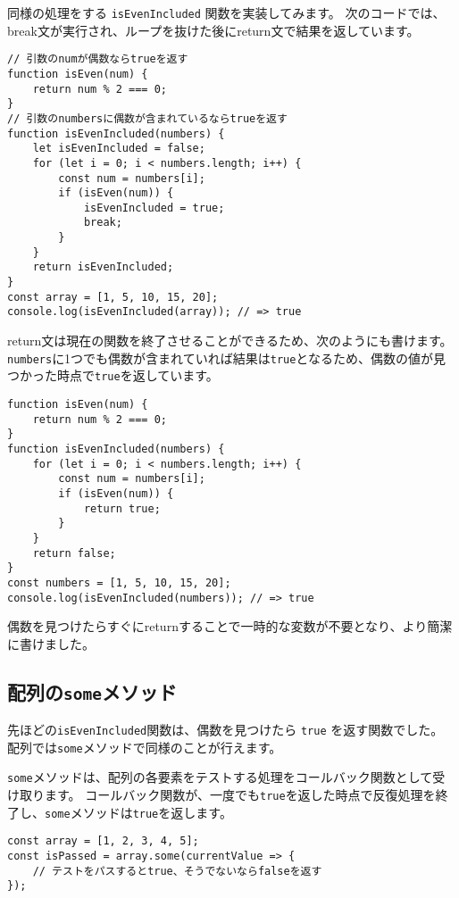 同様の処理をする \texttt{isEvenIncluded}
関数を実装してみます。
次のコードでは、break文が実行され、ループを抜けた後にreturn文で結果を返しています。

\begin{lstlisting}
// 引数のnumが偶数ならtrueを返す
function isEven(num) {
    return num % 2 === 0;
}
// 引数のnumbersに偶数が含まれているならtrueを返す
function isEvenIncluded(numbers) {
    let isEvenIncluded = false;
    for (let i = 0; i < numbers.length; i++) {
        const num = numbers[i];
        if (isEven(num)) {
            isEvenIncluded = true;
            break;
        }
    }
    return isEvenIncluded;
}
const array = [1, 5, 10, 15, 20];
console.log(isEvenIncluded(array)); // => true
\end{lstlisting}

return文は現在の関数を終了させることができるため、次のようにも書けます。
\texttt{numbers}に1つでも偶数が含まれていれば結果は\texttt{true}となるため、偶数の値が見つかった時点で\texttt{true}を返しています。

\begin{lstlisting}
function isEven(num) {
    return num % 2 === 0;
}
function isEvenIncluded(numbers) {
    for (let i = 0; i < numbers.length; i++) {
        const num = numbers[i];
        if (isEven(num)) {
            return true;
        }
    }
    return false;
}
const numbers = [1, 5, 10, 15, 20];
console.log(isEvenIncluded(numbers)); // => true
\end{lstlisting}

偶数を見つけたらすぐにreturnすることで一時的な変数が不要となり、より簡潔に書けました。

\hypertarget{array-some}{%
\subsection{\texorpdfstring{配列の\texttt{some}メソッド}{配列のsomeメソッド}}\label{array-some}}

先ほどの\texttt{isEvenIncluded}関数は、偶数を見つけたら
\texttt{true} を返す関数でした。
配列では\texttt{some}メソッドで同様のことが行えます。

\texttt{some}メソッドは、配列の各要素をテストする処理をコールバック関数として受け取ります。
コールバック関数が、一度でも\texttt{true}を返した時点で反復処理を終了し、\texttt{some}メソッドは\texttt{true}を返します。

\begin{lstlisting}
const array = [1, 2, 3, 4, 5];
const isPassed = array.some(currentValue => {
    // テストをパスするとtrue、そうでないならfalseを返す
});
\end{lstlisting}


